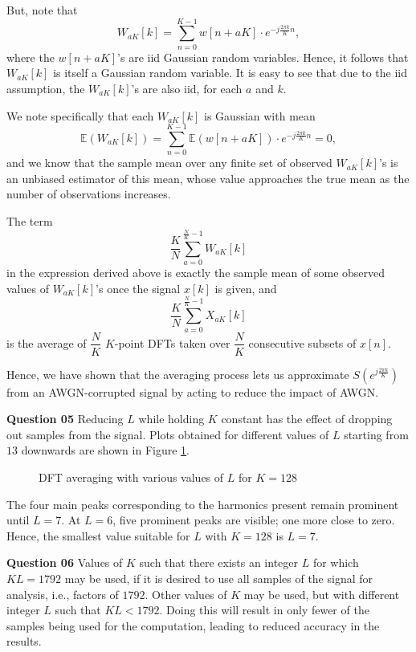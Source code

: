 \documentclass{article}[a4paper]
\begin{document}
	But, note that \[
		W_{aK}[k] = \sum_{n=0}^{K-1} w[n + aK] \cdot e^{-j\frac{2\pi k}{K} n},
	\] where the $w[n + aK]$'s are iid Gaussian random variables. Hence, it follows that $W_{aK}[k]$ is itself a Gaussian random variable. It is easy to see that due to the iid assumption, the $W_{aK}[k]$'s are also iid, for each $a$ and $k$.
	
	We note specifically that each $W_{aK}[k]$ is Gaussian with mean \[
		\mathbb{E}\left(W_{aK}[k]\right)
		=
		\sum_{n=0}^{K-1} \mathbb{E}\left(w[n + aK]\right) \cdot e^{-j\frac{2\pi k}{K} n}
		= 0,
	\] and we know that the sample mean over any finite set of observed $W_{aK}[k]$'s is an unbiased estimator of this mean, whose value approaches the true mean as the number of observations increases.
	
	The term \[
		\dfrac{K}{N} \sum_{a=0}^{\frac{N}{K}-1} W_{aK} [k]
	\] in the expression derived above is exactly the sample mean of some observed values of $W_{aK}[k]$'s once the signal $x[k]$ is given, and \[
		\dfrac{K}{N} \sum_{a=0}^{\frac{N}{K}-1} X_{aK} [k]
	\] is the average of $\dfrac{N}{K}$ $K$-point DFTs taken over $\dfrac{N}{K}$ consecutive subsets of $x[n]$.
	
	Hence, we have shown that the averaging process lets us approximate $S\left(e^{j\frac{2\pi k}{K}}\right)$ from an AWGN-corrupted signal by acting to reduce the impact of AWGN.
	\medskip
	
	\textbf{Question 05} Reducing $L$ while holding $K$ constant has the effect of dropping out samples from the signal. Plots obtained for different values of $L$ starting from $13$ downwards are shown in Figure \ref{smallestl}.
	
	\begin{figure}[H]
		\centering
		\caption{DFT averaging with various values of $L$ for $K=128$}
		\label{smallestl}
	\end{figure}
	
	The four main peaks corresponding to the harmonics present remain prominent until $L=7$. At $L=6$, five prominent peaks are visible; one more close to zero. Hence, the smallest value suitable for $L$ with $K=128$ is $L=7$.
	\medskip
	
	\textbf{Question 06} Values of $K$ such that there exists an integer $L$ for which $KL = 1792$ may be used, if it is desired to use all samples of the signal for analysis, i.e., factors of $1792$. Other values of $K$ may be used, but with different integer $L$ such that $KL < 1792$. Doing this will result in only fewer of the samples being used for the computation, leading to reduced accuracy in the results.
	
\end{document}
